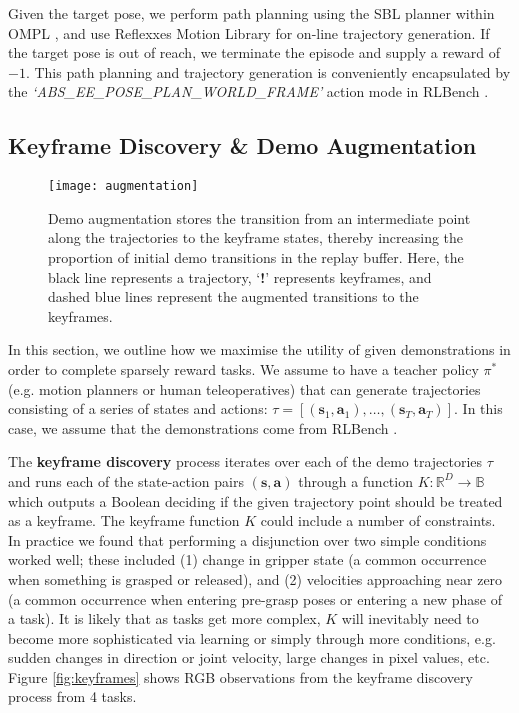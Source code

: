 \documentclass[letterpaper, 10 pt, journal, twoside]{IEEEtran}
\newcommand{\bs}{\mathbf{s}}
\newcommand{\ba}{\mathbf{a}}
\newcommand{\trajectory}{\ensuremath{\tau}}
\begin{document}
Given the target pose, we perform path planning using the SBL \cite{sanchez2003single} planner within OMPL \cite{sucan2012ompl}, and use Reflexxes Motion Library for on-line trajectory generation. If the target pose is out of reach, we terminate the episode and supply a reward of $-1$. This path planning and trajectory generation is conveniently encapsulated by the \textit{`ABS\_EE\_POSE\_PLAN\_WORLD\_FRAME'} action mode in RLBench \cite{james2019rlbench}.

\subsection{Keyframe Discovery \& Demo Augmentation}
\label{sec:demo_augmentation}

\begin{figure}[]
\centering
\texttt{[image: augmentation]}
\caption{Demo augmentation stores the transition from an intermediate point along the trajectories to the keyframe states, thereby increasing the proportion of initial demo transitions in the replay buffer. Here, the black line represents a trajectory, `\textbf{!}' represents keyframes, and dashed blue lines represent the augmented transitions to the keyframes.}
\label{fig:augmentation}
\end{figure}

In this section, we outline how we maximise the utility of given demonstrations in order to complete sparsely reward tasks. We assume to have a teacher policy $\pi^*$ (e.g. motion planners or human teleoperatives) that can generate trajectories consisting of a series of states and actions: $\trajectory = [(\bs_1, \ba_1), \ldots, (\bs_T, \ba_T)]$. In this case, we assume that the demonstrations come from RLBench \cite{james2019rlbench}. 

The \textbf{keyframe discovery} process iterates over each of the demo trajectories $\trajectory$ and runs each of the state-action pairs $(\bs, \ba)$ through a function $K: \mathbb{R}^D \rightarrow \mathbb{B}$ which outputs a Boolean deciding if the given trajectory point should be treated as a keyframe. The keyframe function $K$ could include a number of constraints. In practice we found that performing a disjunction over two simple conditions worked well; these included (1) change in gripper state (a common occurrence when something is grasped or released), and (2) velocities approaching near zero (a common occurrence when entering pre-grasp poses or entering a new phase of a task). It is likely that as tasks get more complex, $K$ will inevitably need to become more sophisticated via learning or simply through more conditions, e.g. sudden changes in direction or joint velocity, large changes in pixel values, etc. Figure \ref{fig:keyframes} shows RGB observations from the keyframe discovery process from 4 tasks.
\end{document}
